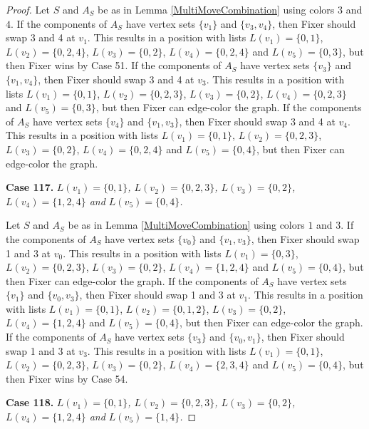 \documentclass[12pt]{amsart}
\theoremstyle{plain}
\theoremstyle{definition}
\theoremstyle{remark}
\begin{document}
\begin{proof}
Let $S$ and $A_S$ be as in Lemma \ref{MultiMoveCombination} using colors $3$ and $4$. If the components of $A_S$ have vertex sets $\{v_1\}$ and $\{v_3, v_4\}$, then Fixer should swap 3 and 4 at $v_1$. This results in a position with lists $L(v_1) = \{0, 1\}$, $L(v_2) = \{0, 2, 4\}$, $L(v_3) = \{0, 2\}$, $L(v_4) = \{0, 2, 4\}$ and $L(v_5) = \{0, 3\}$, but then Fixer wins by Case 51.
If the components of $A_S$ have vertex sets $\{v_3\}$ and $\{v_1, v_4\}$, then Fixer should swap 3 and 4 at $v_3$. This results in a position with lists $L(v_1) = \{0, 1\}$, $L(v_2) = \{0, 2, 3\}$, $L(v_3) = \{0, 2\}$, $L(v_4) = \{0, 2, 3\}$ and $L(v_5) = \{0, 3\}$, but then Fixer can edge-color the graph.
If the components of $A_S$ have vertex sets $\{v_4\}$ and $\{v_1, v_3\}$, then Fixer should swap 3 and 4 at $v_4$. This results in a position with lists $L(v_1) = \{0, 1\}$, $L(v_2) = \{0, 2, 3\}$, $L(v_3) = \{0, 2\}$, $L(v_4) = \{0, 2, 4\}$ and $L(v_5) = \{0, 4\}$, but then Fixer can edge-color the graph.

\noindent\textbf{Case 117.  }\textit{$L(v_1) = \{0, 1\}$, $L(v_2) = \{0, 2, 3\}$, $L(v_3) = \{0, 2\}$, $L(v_4) = \{1, 2, 4\}$ and $L(v_5) = \{0, 4\}$.}

Let $S$ and $A_S$ be as in Lemma \ref{MultiMoveCombination} using colors $1$ and $3$. If the components of $A_S$ have vertex sets $\{v_0\}$ and $\{v_1, v_3\}$, then Fixer should swap 1 and 3 at $v_0$. This results in a position with lists $L(v_1) = \{0, 3\}$, $L(v_2) = \{0, 2, 3\}$, $L(v_3) = \{0, 2\}$, $L(v_4) = \{1, 2, 4\}$ and $L(v_5) = \{0, 4\}$, but then Fixer can edge-color the graph.
If the components of $A_S$ have vertex sets $\{v_1\}$ and $\{v_0, v_3\}$, then Fixer should swap 1 and 3 at $v_1$. This results in a position with lists $L(v_1) = \{0, 1\}$, $L(v_2) = \{0, 1, 2\}$, $L(v_3) = \{0, 2\}$, $L(v_4) = \{1, 2, 4\}$ and $L(v_5) = \{0, 4\}$, but then Fixer can edge-color the graph.
If the components of $A_S$ have vertex sets $\{v_3\}$ and $\{v_0, v_1\}$, then Fixer should swap 1 and 3 at $v_3$. This results in a position with lists $L(v_1) = \{0, 1\}$, $L(v_2) = \{0, 2, 3\}$, $L(v_3) = \{0, 2\}$, $L(v_4) = \{2, 3, 4\}$ and $L(v_5) = \{0, 4\}$, but then Fixer wins by Case 54.

\noindent\textbf{Case 118.  }\textit{$L(v_1) = \{0, 1\}$, $L(v_2) = \{0, 2, 3\}$, $L(v_3) = \{0, 2\}$, $L(v_4) = \{1, 2, 4\}$ and $L(v_5) = \{1, 4\}$.}


\end{proof}
\end{document}

